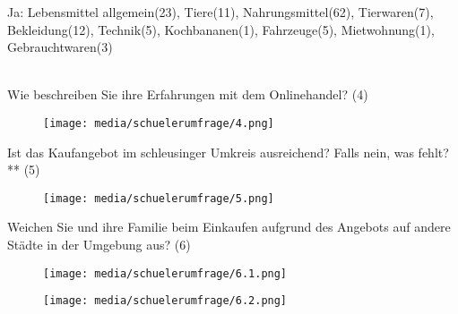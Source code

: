 Ja: Lebensmittel allgemein(23), Tiere(11), Nahrungsmittel(62), Tierwaren(7), Bekleidung(12), Technik(5), Kochbananen(1), Fahrzeuge(5), Mietwohnung(1), Gebrauchtwaren(3)\\\\
\fi

\newpage\noindent Wie beschreiben Sie ihre Erfahrungen mit dem Onlinehandel? (4)
\begin{figure}[H]
    \begin{center}
        \texttt{[image: media/schuelerumfrage/4.png]}
    \end{center}
\end{figure}
\iffalse
eher positiv: 96

eher negativ: 2

neutral: 49\\\\
\fi
\noindent Ist das Kaufangebot im schleusinger Umkreis ausreichend? Falls nein, was fehlt?** (5)\\

\begin{figure}[H]
    \begin{center}
        \texttt{[image: media/schuelerumfrage/5.png]}
    \end{center}
\end{figure}
\iffalse
Ja: 50

Nein, es fehlt...: Fastfood(4), Bekleidung(29), Schuhgeschäfte(3), Sportgeschäfte(5), Kino(3), Theater(1), Discotheken/ Clubs(2), Technikläden(9), Buch/ Mangaläden(6), Ikea(4), jugendorientierte Geschäfte(9)\\\\
\fi
\newpage\noindent Weichen Sie und ihre Familie beim Einkaufen aufgrund des Angebots auf andere Städte in der Umgebung aus? (6)\\
\iffalse
Nein: 46

Ja: 101: Coburg(46), Suhl(74), Meiningen(3), Erfurt(37), Hildburghausen(12), Zella-Mehlis(10), Bamberg(1)\\\\
\fi

\begin{figure}[H]
    \begin{center}
        \texttt{[image: media/schuelerumfrage/6.1.png]}
    \end{center}
\end{figure}

\begin{figure}[H]
    \begin{center}
        \texttt{[image: media/schuelerumfrage/6.2.png]}
    \end{center}
\end{figure}

